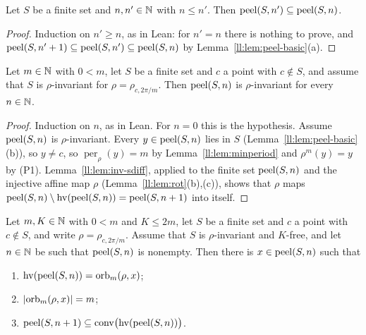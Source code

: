 \begin{lemma}
\label{ll:lem:antitone}
Let $S$ be a finite set and $n,n'\in\mathbb N$ with $n\le n'$. Then $\operatorname{peel}(S,n')\subseteq\operatorname{peel}(S,n)$.
\end{lemma}

\begin{proof}
Induction on $n'\ge n$, as in Lean: for $n'=n$ there is nothing to prove, and
$\operatorname{peel}(S,n'+1)\subseteq\operatorname{peel}(S,n')\subseteq\operatorname{peel}(S,n)$ by Lemma~\ref{ll:lem:peel-basic}(a).
\end{proof}

\begin{lemma}
\label{ll:lem:inv-peel}
Let $m\in\mathbb N$ with $0<m$, let $S$ be a finite set and $c$ a point with $c\notin S$, and assume that $S$ is
$\rho$-invariant for $\rho=\rho_{c,2\pi/m}$. Then $\operatorname{peel}(S,n)$ is $\rho$-invariant for every $n\in\mathbb N$.
\end{lemma}

\begin{proof}
Induction on $n$, as in Lean. For $n=0$ this is the hypothesis. Assume $\operatorname{peel}(S,n)$ is $\rho$-invariant. Every
$y\in\operatorname{peel}(S,n)$ lies in $S$ (Lemma~\ref{ll:lem:peel-basic}(b)), so $y\ne c$, so $\operatorname{per}_\rho(y)=m$ by
Lemma~\ref{ll:lem:minperiod} and $\rho^m(y)=y$ by (P1). Lemma~\ref{ll:lem:inv-sdiff}, applied to the finite set
$\operatorname{peel}(S,n)$ and the injective affine map $\rho$ (Lemma~\ref{ll:lem:rot}(b),(c)), shows that $\rho$ maps
$\operatorname{peel}(S,n)\setminus\operatorname{hv}(\operatorname{peel}(S,n))=\operatorname{peel}(S,n+1)$ into itself.
\end{proof}

\begin{theorem}\label{ll:thm:layers}
Let $m,K\in\mathbb N$ with $0<m$ and $K\le2m$, let $S$ be a finite set and $c$ a point with $c\notin S$, and write
$\rho=\rho_{c,2\pi/m}$. Assume that $S$ is $\rho$-invariant and $K$-free, and let $n\in\mathbb N$ be such that $\operatorname{peel}(S,n)$
is nonempty. Then there is $x\in\operatorname{peel}(S,n)$ such that
\begin{enumerate}[label=(\alph*)]
\item $\operatorname{hv}(\operatorname{peel}(S,n))=\operatorname{orb}_m(\rho,x)$;
\item $\lvert\operatorname{orb}_m(\rho,x)\rvert=m$;
\item $\operatorname{peel}(S,n+1)\subseteq\operatorname{conv}\bigl(\operatorname{hv}(\operatorname{peel}(S,n))\bigr)$.
\end{enumerate}
\end{theorem}

